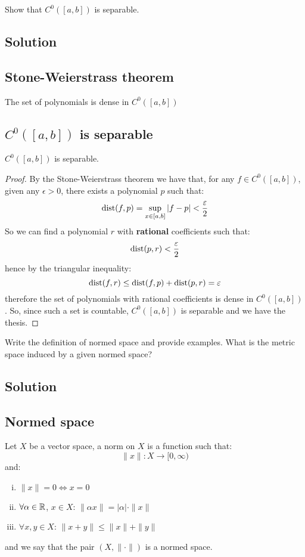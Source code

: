 \sheet


\question
Show that $C^0([a, b])$ is separable.

\subsection*{Solution}

\subsection{Stone-Weierstrass theorem}
The set of polynomials is dense in $C^0([a,b])$

\subsection{\texorpdfstring{$C^0([a,b])$}{C0} is separable}
$C^0([a,b])$ is separable.

\begin{proof}
    By the Stone-Weierstrass theorem we have that, for any $f\in C^0([a,b])$, given any $\epsilon > 0$, there exists a polynomial $p$ such that:
    \[ \operatorname*{dist}(f,p)=\sup_{x\in [a,b]} |f-p| < \frac{\varepsilon}{2} \]
    So we can find a polynomial $r$ with \textbf{rational} coefficients such that:
    \[ \operatorname*{dist}(p,r)<\frac{\varepsilon}{2}\]  
    hence by the triangular inequality:
    \[ \operatorname*{dist}(f,r) \leq \operatorname*{dist}(f,p) + \operatorname*{dist}(p,r) = \varepsilon \]
    therefore the set of polynomials with rational coefficients is dense in $C^0([a,b])$. So, since such a set is countable, $C^0([a,b])$ is separable and we have the thesis.
\end{proof}


\question
Write the definition of normed space and provide examples. What is the metric space induced by a given normed space?

\subsection*{Solution}

\subsection{Normed space}
Let $X$ be a vector space, a norm on $X$ is a function such that:
\[ \|x\| : X \to [0, \infty) \]
and:
\begin{enumerate}[i)]
    \item $\|x\|=0 \iff x=0$
    \item $\forall \alpha \in \mathbb{R}$, $x \in X$: $\|\alpha x\| = |\alpha| \cdot \|x\|$
    \item $\forall x,y \in X$: $\|x+y\| \leq \|x\| + \|y\|$ 
\end{enumerate} 
and we say that the pair $(X, \| \cdot \|)$ is a normed space.

